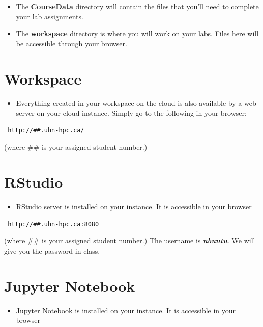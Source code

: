 \documentclass[
]{book}
\providecommand{\tightlist}{%
  \setlength{\itemsep}{0pt}\setlength{\parskip}{0pt}}
\begin{document}
\begin{itemize}
\item
  The \textbf{CourseData} directory will contain the files that you'll need to complete your lab assignments.
\item
  The \textbf{workspace} directory is where you will work on your labs. Files here will be accessible through your browser.
\end{itemize}

\section{Workspace}\label{workspace}

\begin{itemize}
\tightlist
\item
  Everything created in your workspace on the cloud is also available by a web server on your cloud instance. Simply go to the following in your browser:
\end{itemize}

\begin{verbatim}
 http://##.uhn-hpc.ca/
\end{verbatim}

(where \#\# is your assigned student number.)

\section{RStudio}\label{rstudio}

\begin{itemize}
\tightlist
\item
  RStudio server is installed on your instance. It is accessible in your browser
\end{itemize}

\begin{verbatim}
 http://##.uhn-hpc.ca:8080
\end{verbatim}

(where \#\# is your assigned student number.) The username is \textbf{\emph{ubuntu}}. We will give you the password in class.

\section{Jupyter Notebook}\label{jupyter-notebook}

\begin{itemize}
\tightlist
\item
  Jupyter Notebook is installed on your instance. It is accessible in your browser
\end{itemize}
\end{document}
